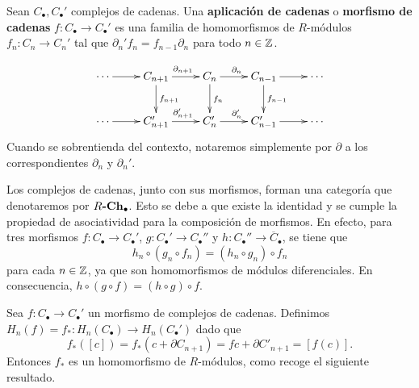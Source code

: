 \begin{definicion}
	Sean $C_{\bullet},C_{\bullet}'$ complejos de cadenas. Una \textbf{aplicación
		de cadenas} o \textbf{morfismo de cadenas}
	$f: C_{\bullet}\rightarrow C_{\bullet}'$ es una familia de homomorfismos de
	$R$-módulos $f_{n}: C_{n}\rightarrow C_{n}'$ tal que
	$\partial_{n}'f_{n}= f_{n-1}\partial_{n}$ para todo $n \in \mathbb{Z}$.
\end{definicion}
\begin{equation}
	\label{chaincomplex}\xymatrix{ \cdots \ar@{->}[r] & C_{n+1} \ar@{->}[r]^{\partial_{n+1}} \ar@{->}[d]^{f_{n+1}} & C_n \ar@{->}[r]^{\partial_{n}} \ar@{->}[d]^{f_n} & C_{n-1} \ar@{->}[r] \ar@{->}[d]^{f_{n-1}} & \cdots \\ \cdots \ar@{->}[r] & C'_{n+1} \ar@{->}[r]^{\partial'_{n+1}} & C'_n \ar@{->}[r]^{\partial'_{n}} & C'_{n-1} \ar@{->}[r] & \cdots }
\end{equation}
Cuando se sobrentienda del contexto, notaremos simplemente por $\partial$ a los correspondientes
$\partial_{n}$ y $\partial_{n}'$.

Los complejos de cadenas, junto con sus morfismos, forman una categoría que denotaremos
por $R\textbf{-}\mathbf{Ch_\bullet}$. Esto se debe a que existe la identidad y se
cumple la propiedad de asociatividad para la composición de morfismos. En efecto,
para tres morfismos $f : C_{\bullet}\to C_{\bullet}'$, $g : C_{\bullet}' \to C_{\bullet}
''$ y $h : C_{\bullet}'' \to \overline{C}_{\bullet}$, se tiene que
\[
h_{n}\circ (g_{n}\circ f_{n}) = (h_{n}\circ g_{n}) \circ f_{n}
\]
para cada $n \in \mathbb{Z}$, ya que son homomorfismos de módulos diferenciales. En
consecuencia, $h \circ (g \circ f) = (h \circ g) \circ f$.

Sea $f : C_{\bullet}\to C_{\bullet}'$ un morfismo de complejos de cadenas.
Definimos $H_{n}(f) = f_{*}: H_{n}(C_{\bullet}) \to H_{n}(C_{\bullet}')$ dado
que
\[
f_{*}([c]) = f_{*}(c + \partial C_{n+1}) = fc + \partial C'_{n+1}= [f(c)].
\]
Entonces $f_{*}$ es un homomorfismo de $R$-módulos, como recoge el siguiente resultado.

